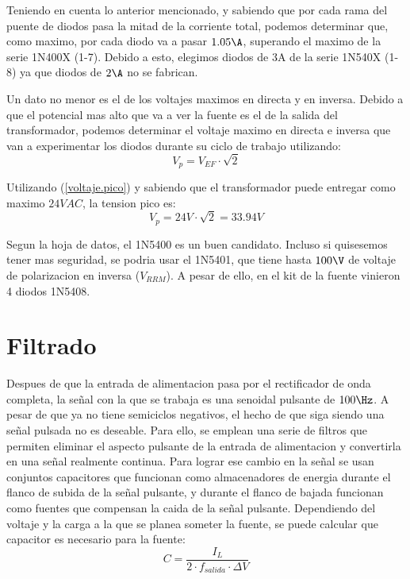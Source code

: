 \documentclass[chaptersright]{informeutn}
\begin{document}
          Teniendo en cuenta lo anterior mencionado, y sabiendo que por cada rama del puente de diodos pasa la mitad de
          la corriente total, podemos determinar que, como maximo, por cada diodo va a pasar $1.05\A$, superando el
          maximo de la serie 1N400X (1-7). Debido a esto, elegimos diodos de 3A de la serie 1N540X (1-8) ya que diodos
          de $2\A$ no se fabrican.

          Un dato no menor es el de los voltajes maximos en directa y en inversa. Debido a que el potencial mas alto
          que va a ver la fuente es el de la salida del transformador, podemos determinar el voltaje maximo en directa
          e inversa que van a experimentar los diodos durante su ciclo de trabajo utilizando:
          \begin{equation}
            V_p = V_{EF} \cdot \sqrt{2}
            \label{voltaje.pico}
          \end{equation}

          Utilizando (\ref{voltaje.pico}) y sabiendo que el transformador puede entregar como maximo $24VAC$, la
          tension pico es:
          \begin{equation*}
            V_p = 24V \cdot \sqrt{2} = 33.94V
          \end{equation*}

          Segun la hoja de datos, el 1N5400 es un buen candidato. Incluso si quisesemos tener mas seguridad, se podria
          usar el 1N5401, que tiene hasta $100\V$ de voltaje de polarizacion en inversa ($V_{RRM}$). A pesar de ello,
          en el kit de la fuente vinieron 4 diodos 1N5408.


      \section{Filtrado}
        Despues de que la entrada de alimentacion pasa por el rectificador de onda completa, la señal con la que se
        trabaja es una senoidal pulsante de $100\Hz$. A pesar de que ya no tiene semiciclos negativos, el hecho de que
        siga siendo una señal pulsada no es deseable. Para ello, se emplean una serie de filtros que permiten eliminar
        el aspecto pulsante de la entrada de alimentacion y convertirla en una señal realmente continua. Para lograr
        ese cambio en la señal se usan conjuntos capacitores que funcionan como almacenadores de energia durante el
        flanco de subida de la señal pulsante, y durante el flanco de bajada funcionan como fuentes que compensan
        la caida de la señal pulsante. Dependiendo del voltaje y la carga a la que se planea someter la fuente, se
        puede calcular que capacitor es necesario para la fuente:
        \begin{equation}
            C = \frac{I_{L}}{2 \cdot f_{salida} \cdot \varDelta V}
        \end{equation}
\end{document}
